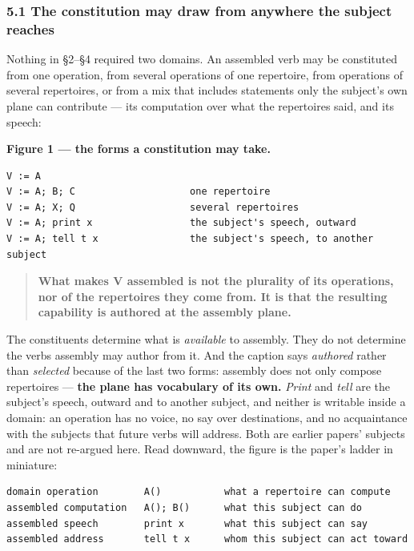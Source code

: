 \documentclass[
]{article}
\begin{document}
\subsubsection{5.1 The constitution may draw from anywhere the subject
reaches}\label{the-constitution-may-draw-from-anywhere-the-subject-reaches}

Nothing in §2--§4 required two domains. An assembled verb may be
constituted from one operation, from several operations of one
repertoire, from operations of several repertoires, or from a mix that
includes statements only the subject's own plane can contribute --- its
computation over what the repertoires said, and its speech:

\textbf{Figure 1 --- the forms a constitution may take.}

\begin{verbatim}
V := A
V := A; B; C                    one repertoire
V := A; X; Q                    several repertoires
V := A; print x                 the subject's speech, outward
V := A; tell t x                the subject's speech, to another subject
\end{verbatim}

\begin{quote}
\textbf{What makes V assembled is not the plurality of its operations,
nor of the repertoires they come from. It is that the resulting
capability is authored at the assembly plane.}
\end{quote}

The constituents determine what is \emph{available} to assembly. They do
not determine the verbs assembly may author from it. And the caption
says \emph{authored} rather than \emph{selected} because of the last two
forms: assembly does not only compose repertoires --- \textbf{the plane
has vocabulary of its own.} \emph{Print} and \emph{tell} are the
subject's speech, outward and to another subject, and neither is
writable inside a domain: an operation has no voice, no say over
destinations, and no acquaintance with the subjects that future verbs
will address. Both are earlier papers' subjects and are not re-argued
here. Read downward, the figure is the paper's ladder in miniature:

\begin{verbatim}
domain operation        A()           what a repertoire can compute
assembled computation   A(); B()      what this subject can do
assembled speech        print x       what this subject can say
assembled address       tell t x      whom this subject can act toward
\end{verbatim}
\end{document}
